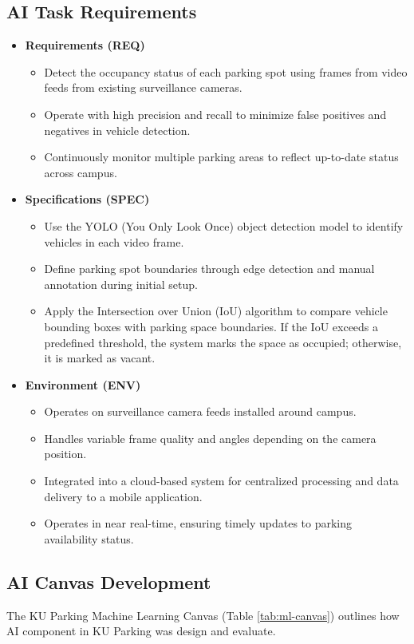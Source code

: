 \subsection{AI Task Requirements}
\label{subsection:ai-task-requirement}
\begin{itemize}
  \item \textbf{Requirements (REQ)}
  \begin{itemize}
    \item Detect the occupancy status of each parking spot using frames from video feeds from existing surveillance cameras.
    \item Operate with high precision and recall to minimize false positives and negatives in vehicle detection.
    \item Continuously monitor multiple parking areas to reflect up-to-date status across campus.
  \end{itemize}
  \item \textbf{Specifications (SPEC)}
  \begin{itemize}
    \item Use the YOLO (You Only Look Once) object detection model to identify vehicles in each video frame.
    \item Define parking spot boundaries through edge detection and manual annotation during initial setup.
    \item Apply the Intersection over Union (IoU) algorithm to compare vehicle bounding boxes with parking space boundaries. If the IoU exceeds a predefined threshold, the system marks the space as occupied; otherwise, it is marked as vacant.
  \end{itemize}
  \item \textbf{Environment (ENV)}
  \begin{itemize}
    \item Operates on surveillance camera feeds installed around campus.
    \item Handles variable frame quality and angles depending on the camera position.
    \item Integrated into a cloud-based system for centralized processing and data delivery to a mobile application.
    \item Operates in near real-time, ensuring timely updates to parking availability status.
  \end{itemize}
\end{itemize}


\subsection{AI Canvas Development}
\label{subsection:ai-canvas-development}
The KU Parking Machine Learning Canvas (Table \ref{tab:ml-canvas}) outlines how AI component in KU Parking was design and evaluate.

